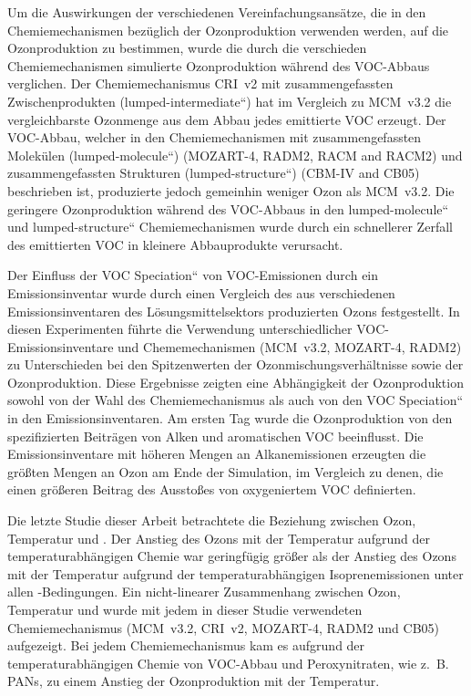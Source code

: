 Um die Auswirkungen der verschiedenen Vereinfachungsansätze, die in den Chemiemechanismen bezüglich der Ozonproduktion verwenden werden, auf die Ozonproduktion zu bestimmen, wurde die durch die verschieden Chemiemechanismen simulierte Ozonproduktion während des VOC-Abbaus verglichen.
Der Chemiemechanismus CRI~v2 mit zusammengefassten Zwischenprodukten (\quotedblbase lumped-intermediate``) hat im Vergleich zu  MCM~v3.2 die vergleichbarste Ozonmenge aus dem Abbau jedes emittierte VOC erzeugt. 
Der VOC-Abbau, welcher in den Chemiemechanismen mit zusammengefassten Molekülen (\quotedblbase lumped-molecule``) (MOZART-4, RADM2, RACM and RACM2) und zusammengefassten Strukturen (\quotedblbase lumped-structure``) (CBM-IV and CB05) beschrieben ist, produzierte jedoch gemeinhin weniger Ozon als MCM~v3.2. 
Die geringere Ozonproduktion während des VOC-Abbaus in den \quotedblbase lumped-molecule`` und \quotedblbase lumped-structure`` Chemiemechanismen wurde durch ein schnellerer Zerfall des emittierten VOC in kleinere Abbauprodukte verursacht.

Der Einfluss der \quotedblbase VOC Speciation`` von VOC-Emissionen durch ein Emissionsinventar wurde durch einen Vergleich des aus verschiedenen Emissionsinventaren des Lösungsmittelsektors produzierten Ozons festgestellt.
In diesen Experimenten führte die Verwendung unterschiedlicher VOC-Emissionsinventare und Chememechanismen (MCM~v3.2, MOZART-4, RADM2) zu Unterschieden bei den Spitzenwerten der Ozonmischungsverhältnisse sowie der Ozonproduktion.
Diese Ergebnisse zeigten eine Abhängigkeit der Ozonproduktion sowohl von der Wahl des Chemiemechanismus als auch von den \quotedblbase VOC Speciation`` in den Emissionsinventaren.
Am ersten Tag wurde die Ozonproduktion von den spezifizierten Beiträgen von Alken und aromatischen VOC beeinflusst.
Die Emissionsinventare mit höheren Mengen an Alkanemissionen erzeugten die größten Mengen an Ozon am Ende der Simulation, im Vergleich zu denen, die einen größeren Beitrag des Ausstoßes von oxygeniertem VOC definierten.

Die letzte Studie dieser Arbeit betrachtete die Beziehung zwischen Ozon, Temperatur und .
Der Anstieg des Ozons mit der Temperatur aufgrund der temperaturabhängigen Chemie war geringfügig größer als der Anstieg des Ozons mit der Temperatur aufgrund der temperaturabhängigen Isoprenemissionen unter allen -Bedingungen.
Ein nicht-linearer Zusammenhang zwischen Ozon, Temperatur und  wurde mit jedem in dieser Studie verwendeten Chemiemechanismus (MCM~v3.2, CRI~v2, MOZART-4, RADM2 und CB05) aufgezeigt.
Bei jedem Chemiemechanismus kam es aufgrund der temperaturabhängigen Chemie von VOC-Abbau und Peroxynitraten, wie z.~B. PANs, zu einem Anstieg der Ozonproduktion mit der Temperatur. 

